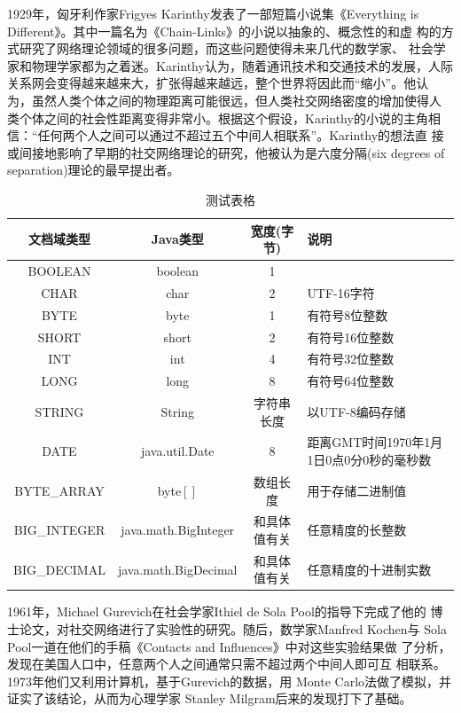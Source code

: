 \documentclass[master]{njuthesis}
\begin{document}
1929年，匈牙利作家Frigyes Karinthy发表了一部短篇小说集《Everything is
  Different》。其中一篇名为《Chain-Links》的小说以抽象的、概念性的和虚
构的方式研究了网络理论领域的很多问题，而这些问题使得未来几代的数学家、
社会学家和物理学家都为之着迷\cite{newman2006structure,
  barabasi2003linked}。Karinthy认为，随着通讯技术和交通技术的发展，人际
关系网会变得越来越来大，扩张得越来越远，整个世界将因此而``缩小''。他认
为，虽然人类个体之间的物理距离可能很远，但人类社交网络密度的增加使得人
类个体之间的社会性距离变得非常小。根据这个假设，Karinthy的小说的主角相
信：``任何两个人之间可以通过不超过五个中间人相联系''。Karinthy的想法直
接或间接地影响了早期的社交网络理论的研究，他被认为是六度分隔(six
degrees of separation)理论的最早提出者\cite{barabasi2003linked}。


\begin{table}
  \centering
  \begin{tabular}{cccp{38mm}}
    \toprule
    \textbf{文档域类型} & \textbf{Java类型} & \textbf{宽度(字节)} & \textbf{说明} \\
    \midrule
    BOOLEAN  & boolean &  1  & \\
    CHAR     & char    &  2  & UTF-16字符 \\
    BYTE     & byte    &  1  & 有符号8位整数 \\
    SHORT    & short   &  2  & 有符号16位整数 \\
    INT      & int     &  4  & 有符号32位整数 \\
    LONG     & long    &  8  & 有符号64位整数 \\
    STRING   & String  &  字符串长度  & 以UTF-8编码存储 \\
    DATE     & java.util.Date & 8 & 距离GMT时间1970年1月1日0点0分0秒的毫秒数 \\
    BYTE\_ARRAY & byte$[]$ & 数组长度 & 用于存储二进制值 \\
    BIG\_INTEGER & java.math.BigInteger & 和具体值有关 & 任意精度的长整数 \\
    BIG\_DECIMAL & java.math.BigDecimal & 和具体值有关 & 任意精度的十进制实数 \\
    \bottomrule
  \end{tabular}
  \caption{测试表格}\label{table:test2}
\end{table}

1961年，Michael Gurevich在社会学家Ithiel de Sola Pool的指导下完成了他的
博士论文，对社交网络进行了实验性的研究。随后，数学家Manfred Kochen与
Sola Pool一道在他们的手稿《Contacts and Influences》中对这些实验结果做
了分析，发现在美国人口中，任意两个人之间通常只需不超过两个中间人即可互
相联系\cite{pool1978}。1973年他们又利用计算机，基于Gurevich的数据，用
Monte Carlo法做了模拟，并证实了该结论\cite{pool1978}，从而为心理学家
Stanley Milgram后来的发现打下了基础。
\end{document}
